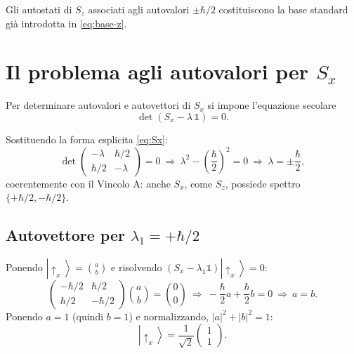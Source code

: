 \documentclass[11pt,a4paper]{article}
\newcommand{\ket}[1]{\left|#1\right\rangle}
\begin{document}
Gli autostati di $S_z$ associati agli autovalori $\pm\hbar/2$ costituiscono la base standard già introdotta in \eqref{eq:base-z}.

\section{Il problema agli autovalori per \texorpdfstring{$S_x$}{Sx}}

Per determinare autovalori e autovettori di $S_x$ si impone l'equazione secolare
\begin{equation}
\det\left(S_x-\lambda\,\mathbb{1}\right)=0.
\label{eq:secolare}
\end{equation}

Sostituendo la forma esplicita \eqref{eq:Sx}:
\begin{equation}
\det\begin{pmatrix}-\lambda & \hbar/2\\ \hbar/2 & -\lambda\end{pmatrix}=0
\ \Longrightarrow\
\lambda^2-\left(\frac{\hbar}{2}\right)^2=0
\ \Longrightarrow\
\lambda=\pm\frac{\hbar}{2},
\label{eq:autovalori-Sx}
\end{equation}
coerentemente con il Vincolo A: anche $S_x$, come $S_z$, possiede spettro $\{+\hbar/2,-\hbar/2\}$.

\subsection{Autovettore per \texorpdfstring{$\lambda_1=+\hbar/2$}{lambda1=+h/2}}

Ponendo $\ket{\uparrow_x}=\binom{a}{b}$ e risolvendo $(S_x-\lambda_1\mathbb{1})\ket{\uparrow_x}=0$:
\[
\begin{pmatrix}-\hbar/2 & \hbar/2\\ \hbar/2 & -\hbar/2\end{pmatrix}\binom{a}{b}=\binom{0}{0}
\ \Longrightarrow\ -\frac{\hbar}{2}a+\frac{\hbar}{2}b=0 \ \Longrightarrow\ a=b.
\]
Ponendo $a=1$ (quindi $b=1$) e normalizzando, $|a|^2+|b|^2=1$:
\begin{equation}
\ket{\uparrow_x} = \frac{1}{\sqrt2}\begin{pmatrix}1\\1\end{pmatrix}.
\label{eq:up-x}
\end{equation}
\end{document}
